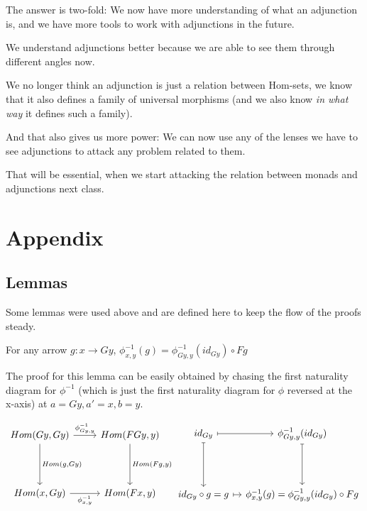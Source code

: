 \documentclass[]{article}
\begin{document}
The answer is two-fold: We now have more understanding of what an adjunction is, and we have more tools to work with adjunctions in the future.

We understand adjunctions better because we are able to see them through different angles now.

We no longer think an adjunction is just a relation between Hom-sets, we know that it also defines a family of universal morphisms (and we also know \textit{in what way} it defines such a family).

And that also gives us more power: We can now use any of the lenses we have to see adjunctions to attack any problem related to them.

That will be essential, when we start attacking the relation between monads and adjunctions next class.

\pagebreak

\section{Appendix}

\subsection{Lemmas}

Some lemmas were used above and are defined here to keep the flow of the proofs steady.

\begin{lemma}{For any arrow $g \colon x \to Gy$, $\phi_{x,y}^{-1}(g) = \phi_{Gy,y}^{-1}(id_{Gy}) \circ Fg$}\label{lem:phi_inv}
	
\end{lemma}

The proof for this lemma can be easily obtained by chasing the first naturality diagram for $\phi^{-1}$ (which is just the first naturality diagram for $\phi$ reversed at the x-axis) at $a = Gy, a' = x, b = y$.

\[
\begin{tikzcd}
Hom(G y, G y) \arrow[r, "\phi_{Gy,y}^{-1}"] \arrow[d, "{Hom(g,Gy)}"] 
& Hom(FG y, y) \arrow[d,"{Hom(Fg,y)}"] \\[25pt]
Hom(x, Gy) \arrow[r, swap, "\phi_{x,y}^{-1}"] & Hom(F x, y)
\end{tikzcd}
\begin{tikzcd}
id_{Gy} \arrow[r,maps to] \arrow[d,maps to] &[-15pt] \phi^{-1}_{Gy,y} (id_{Gy}) \arrow[d, maps to] \\[25pt]
id_{Gy} \circ g = g \arrow[r, maps to] & \phi_{x,y}^{-1} (g) = \phi_{Gy,y}^{-1}(id_{Gy}) \circ F g
\end{tikzcd}
\]
\end{document}
